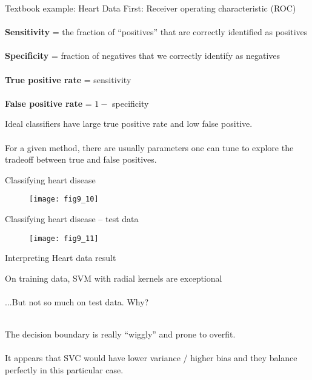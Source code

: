 \documentclass[mathserif, aspectratio=169]{beamer}
\begin{document}
\begin{frame}{Textbook example: Heart Data}
	First: Receiver operating characteristic (ROC)\\~\\

	\textbf{Sensitivity} = the fraction of ``positives'' that are correctly identified as positives  \\~\\

	\textbf{Specificity} = fraction of negatives that we correctly identify as negatives \\~\\

	\textbf{True positive rate} = sensitivity\\~\\

	\textbf{False positive rate} = $1-$ specificity

	Ideal classifiers have large true positive rate and low false positive.  \\~\\

	For a given method, there are usually parameters one can tune to explore the tradeoff between true and false positives.
\end{frame}

\begin{frame}{Classifying heart disease}
	\begin{figure}
		\texttt{[image: fig9\_10]}
		\caption*{}
	\end{figure}
\end{frame}

\begin{frame}{Classifying heart disease -- test data}
	\begin{figure}
		\texttt{[image: fig9\_11]}
		\caption*{}
	\end{figure}
\end{frame}

\begin{frame}{Interpreting Heart data result}

	On training data, SVM with radial kernels are exceptional \\~\\

	...But not so much on test data.  Why?\\~\\
	\pause

	The decision boundary is really ``wiggly'' and prone to overfit. \\~\\

	It appears that SVC would have lower variance / higher bias and they balance perfectly in  this particular case.

\end{frame}
\end{document}
